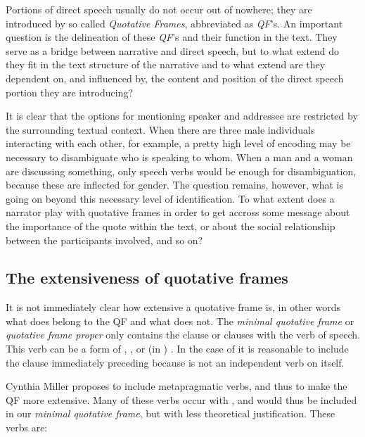 \documentclass[twoside,a4paper,10pt]{article}
\newcommand{\hebr}[1]{\cjRL{#1}}
\newcommand{\mi}[1]{\emph{#1}}
\begin{document}
Portions of direct speech usually do not occur out of nowhere; they are introduced by so called \mi{Quotative Frames}, abbreviated as \mi{QF}'s. An important question is the delineation of these \mi{QF}'s and their function in the text. They serve as a bridge between narrative and direct speech, but to what extend do they fit in the text structure of the narrative and to what extend are they dependent on, and influenced by, the content and position of the direct speech portion they are introducing?

It is clear that the options for mentioning speaker and addressee are restricted by the surrounding textual context. When there are three male individuals interacting with each other, for example, a pretty high level of encoding may be necessary to disambiguate who is speaking to whom. When a man and a woman are discussing something, only speech verbs would be enough for disambiguation, because these are inflected for gender. The question remains, however, what is going on beyond this necessary level of identification. To what extent does a narrator play with quotative frames in order to get accross some message about the importance of the quote within the text, or about the social relationship between the participants involved, and so on?

\subsection{The extensiveness of quotative frames}
It is not immediately clear how extensive a quotative frame is, in other words what does belong to the QF and what does not. The \mi{minimal quotative frame} or \mi{quotative frame proper} only contains the clause or clauses with the verb of speech. This verb can be a form of \hebr{>MR}, \hebr{DBR}, or (in ) \hebr{MLL}. In the case of \hebr{L>MR} it is reasonable to include the clause immediately preceding \hebr{L>MR} because \hebr{L>MR} is not an independent verb on itself.

Cynthia Miller\autocite{Miller} proposes to include metapragmatic verbs, and thus to make the QF more extensive. Many of these verbs occur with \hebr{L>MR}, and would thus be included in our \mi{minimal quotative frame}, but with less theoretical justification. These verbs are:
    
\end{document}
